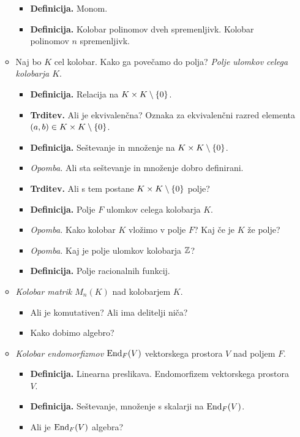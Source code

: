\begin{enumerate}
\begin{itemize}
\begin{itemize}
            \item \colorbox{purple!30}{\textbf{Definicija.}} Monom.
            \item \colorbox{purple!30}{\textbf{Definicija.}} Kolobar polinomov dveh spremenljivk. Kolobar polinomov $n$ spremenljivk.
        \end{itemize}
        \item Naj bo $K$ cel kolobar. Kako ga povečamo do polja? \emph{Polje ulomkov celega kolobarja $K$}.
        \begin{itemize}
            \item \colorbox{purple!30}{\textbf{Definicija.}} Relacija na $K \times K \setminus \left\{0\right\}$.
            \item \colorbox{blue!30}{\textbf{Trditev.}} Ali je ekvivalenčna? Oznaka za ekvivalenčni razred elementa $(a,b) \in K \times K \setminus \left\{0\right\}$.
            \item \colorbox{purple!30}{\textbf{Definicija.}} Seštevanje in množenje na $K \times K \setminus \left\{0\right\}$.
            \item \colorbox{yellow!30}{\emph{Opomba.}} Ali sta seštevanje in množenje dobro definirani.
            \item \colorbox{blue!30}{\textbf{Trditev.}} Ali s tem postane $K \times K \setminus \left\{0\right\}$ polje?
            \item \colorbox{purple!30}{\textbf{Definicija.}} Polje $F$ ulomkov celega kolobarja $K$.
            \item \colorbox{yellow!30}{\emph{Opomba.}} Kako kolobar $K$ vložimo v polje $F$? Kaj če je $K$ že polje?
            \item \colorbox{yellow!30}{\emph{Opomba.}} Kaj je polje ulomkov kolobarja $\mathbb{Z}$?
            \item \colorbox{purple!30}{\textbf{Definicija.}} Polje racionalnih funkcij.
        \end{itemize}

        \item \emph{Kolobar matrik $M_n(K)$} nad kolobarjem $K$.
        \begin{itemize}
            \item Ali je komutativen? Ali ima delitelji niča?
            \item Kako dobimo algebro?
        \end{itemize}

        \newpage
        \item \emph{Kolobar endomorfizmov $\operatorname{End}_F (V)$} vektorskega prostora $V$ nad poljem $F$.
        \begin{itemize}
            \item \colorbox{purple!30}{\textbf{Definicija.}} Linearna preslikava. Endomorfizem vektorskega prostora $V$.
            \item \colorbox{purple!30}{\textbf{Definicija.}} Seštevanje, množenje s skalarji na $\operatorname{End}_F (V)$.
            \item Ali je $\operatorname{End}_F (V)$ algebra?
        \end{itemize}


\end{itemize}
\end{enumerate}
